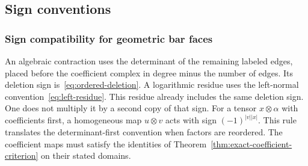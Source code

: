 \subsection{Sign conventions}\label{sec:sign-conventions}


\begingroup
\let\section\subsection
\let\subsection\subsubsection


\endgroup

\subsection{Sign compatibility for geometric bar faces}
\label{sec:bar-residue-sign-interface}

\begin{convention}
\label{conv:orientations-enhanced}
An algebraic contraction uses the determinant of the remaining labeled edges,
placed before the coefficient complex in degree minus the number of edges.
Its deletion sign is~\eqref{eq:ordered-deletion}.
A logarithmic residue uses the left-normal convention~\eqref{eq:left-residue}.
This residue already includes the same deletion sign.
One does not multiply it by a second copy of that sign.
For a tensor $x\otimes\alpha$ with coefficients first,
a homogeneous map $u\otimes v$ acts with sign $(-1)^{|v||x|}$.
This rule translates the determinant-first convention when factors are reordered.
The coefficient maps must satisfy the identities of
Theorem~\ref{thm:exact-coefficient-criterion} on their stated domains.
\end{convention}

